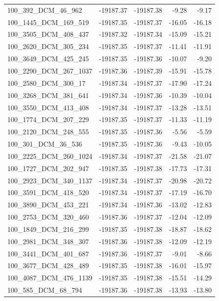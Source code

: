 \documentclass[journal=jacsat,manuscript=article]{achemso}
\begin{document}
\begin{table}[b!]
\begin{tabular}{lrrrr}
100\_392\_DCM\_46\_962    & -19187.37 & -19187.38 &   -9.28 &  -9.17 \\
100\_1445\_DCM\_169\_519  & -19187.35 & -19187.37 &  -16.05 & -16.18 \\
100\_3505\_DCM\_408\_437  & -19187.32 & -19187.34 &  -15.09 & -15.21 \\
100\_2620\_DCM\_305\_234  & -19187.35 & -19187.37 &  -11.41 & -11.91 \\
100\_3649\_DCM\_425\_245  & -19187.35 & -19187.36 &  -10.07 &  -9.20 \\
100\_2290\_DCM\_267\_1037 & -19187.36 & -19187.39 &  -15.91 & -15.78 \\
100\_2580\_DCM\_300\_17   & -19187.34 & -19187.37 &  -17.90 & -17.24 \\
100\_3268\_DCM\_381\_641  & -19187.34 & -19187.36 &  -10.39 & -10.04 \\
100\_3550\_DCM\_413\_408  & -19187.34 & -19187.37 &  -13.28 & -13.51 \\
100\_1774\_DCM\_207\_229  & -19187.35 & -19187.37 &  -11.33 & -11.19 \\
100\_2120\_DCM\_248\_555  & -19187.35 & -19187.36 &   -5.56 &  -5.59 \\
100\_301\_DCM\_36\_536    & -19187.35 & -19187.36 &   -9.43 & -10.05 \\
100\_2225\_DCM\_260\_1024 & -19187.34 & -19187.37 &  -21.58 & -21.07 \\
100\_1727\_DCM\_202\_947  & -19187.35 & -19187.38 &  -17.73 & -17.31 \\
100\_2923\_DCM\_340\_1137 & -19187.34 & -19187.37 &  -20.98 & -20.72 \\
100\_3591\_DCM\_418\_520  & -19187.34 & -19187.37 &  -17.19 & -16.70 \\
100\_3890\_DCM\_453\_221  & -19187.34 & -19187.36 &  -13.02 & -12.83 \\
100\_2753\_DCM\_320\_460  & -19187.36 & -19187.37 &  -12.04 & -12.09 \\
100\_1849\_DCM\_216\_299  & -19187.35 & -19187.38 &  -18.87 & -18.62 \\
100\_2981\_DCM\_348\_307  & -19187.36 & -19187.38 &  -12.09 & -12.19 \\
100\_3441\_DCM\_401\_687  & -19187.36 & -19187.37 &   -9.01 &  -8.66 \\
100\_3677\_DCM\_428\_489  & -19187.35 & -19187.38 &  -16.01 & -15.97 \\
100\_4087\_DCM\_476\_1139 & -19187.35 & -19187.38 &  -15.51 & -14.29 \\
100\_585\_DCM\_68\_794    & -19187.36 & -19187.38 &  -13.93 & -13.80 \\

\end{tabular}
\end{table}
\end{document}
